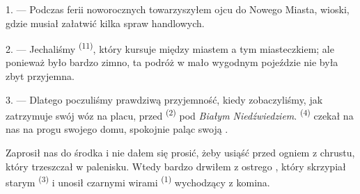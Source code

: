 %
%


\VUsaut{4.0mm}
\VUsaut{3.0mm}
\VUfilet{16mm}
\VUsaut{5.6mm}
\VUsaut{3.0mm}

\VUsaut{3.0mm}

\VUsaut{4.0mm}

1. --- Podczas ferii noworocznych towarzyszyłem ojcu do Nowego Miasta, wioski, gdzie
musiał załatwić kilka spraw handlowych.

2. --- Jechaliśmy  \textsuperscript{(11)}, który kursuje między
miastem a tym miasteczkiem; ale ponieważ było bardzo zimno, ta podróż w mało wygodnym
pojeździe nie była zbyt przyjemna.

3. --- Dlatego poczuliśmy prawdziwą przyjemność, kiedy zobaczyliśmy, jak
 zatrzymuje swój wóz na placu, przed 
\textsuperscript{(2)} pod \textit{Białym Niedźwiedziem}. 
\textsuperscript{(4)} czekał na nas na progu swojego domu, spokojnie paląc swoją
.

Zaprosił nas do środka i nie dałem się prosić, żeby usiąść przed ogniem z chrustu, który
trzeszczał w palenisku. Wtedy bardzo drwiłem z ostrego , który
skrzypiał starym  \textsuperscript{(3)} i unosił czarnymi wirami
 \textsuperscript{(1)} wychodzący z komina.

